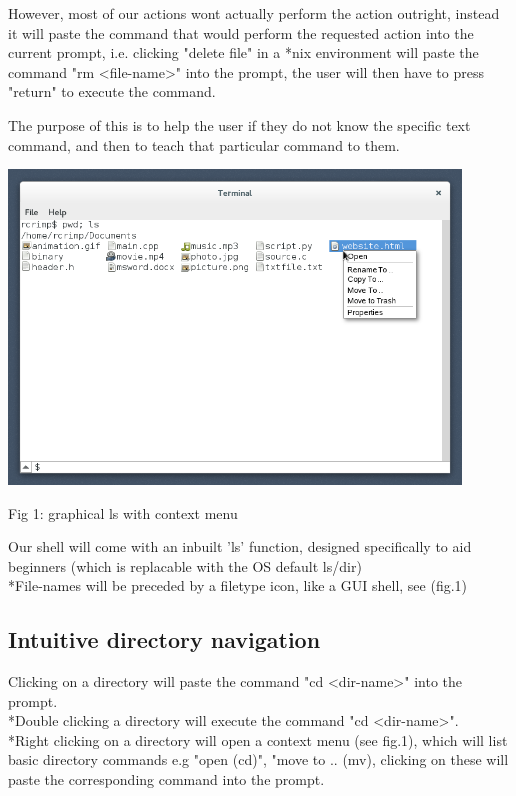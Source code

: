 \documentclass[a4paper,11pt]{article}
\begin{document}
However, most of our actions wont actually perform the action outright, instead it will paste the command that would perform the requested action into the current prompt, i.e. clicking "delete file" in a *nix environment will paste the command "rm \textless file-name\textgreater" into the prompt, the user will then have to press "return" to execute the command.

The purpose of this is to help the user if they do not know the specific text command, and then to teach that particular command to them.


\begin{center}\includegraphics[width=12cm]{context.png}

Fig 1: graphical ls with context menu\end{center}

Our shell will come with an inbuilt 'ls' function, designed specifically to aid beginners
(which is replacable with the OS default ls/dir)
\\*File-names will be preceded by a filetype icon, like a GUI shell, see (fig.1)

\subsection*{Intuitive directory navigation}
Clicking on a directory will paste the command "cd \textless dir-name\textgreater" into the prompt.
\\*Double clicking a directory will execute the command "cd \textless dir-name\textgreater".
\\*Right clicking on a directory will open a context menu (see fig.1), which will list basic directory commands e.g "open (cd)", "move to .. (mv), clicking on these will paste the corresponding command into the prompt.
\end{document}
